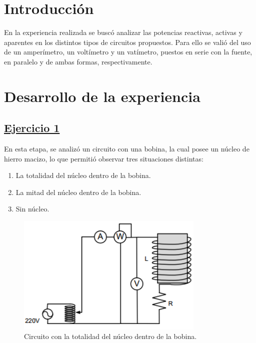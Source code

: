 \documentclass[a4paper]{article}
\begin{document}




\section*{Introducción}

En la experiencia realizada se buscó analizar las potencias reactivas, activas y aparentes en los distintos tipos de circuitos propuestos. Para ello se valió del uso de un amperímetro, un voltímetro y un vatímetro, puestos en serie con la fuente, en paralelo y de ambas formas, respectivamente.

\section*{Desarrollo de la experiencia}

\subsection*{\underline{Ejercicio 1}}

En esta etapa, se analizó un circuito con una bobina, la cual posee un núcleo de hierro macizo, lo que permitió observar tres situaciones distintas:
\begin{enumerate}
	\item La totalidad del núcleo dentro de la bobina.
	\item La mitad del núcleo dentro de la bobina.
	\item Sin núcleo.
\end{enumerate}

\begin{figure}[H]
	\centering
	\includegraphics[width=0.8\textwidth]{Circuito-ejercicio-1A}
	\caption{Circuito con la totalidad del núcleo dentro de la bobina.}
	\label{fig:1a}
\end{figure}
\end{document}
